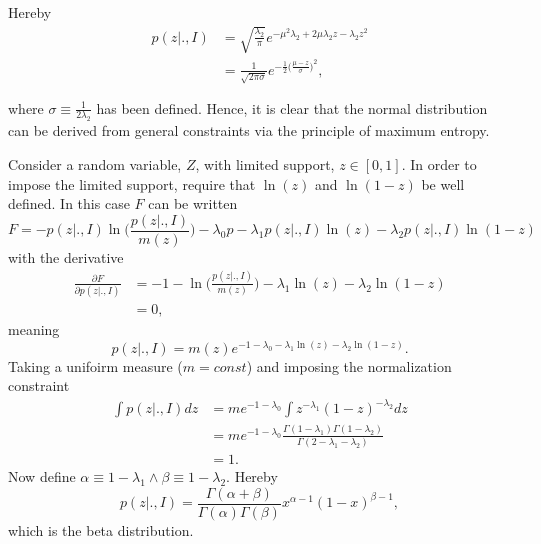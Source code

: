 \begin{example}
\begin{equation}
	\end{equation}
	Hereby
	\begin{equation}
		\begin{split}
			p(z|.,I) &= \sqrt{\frac{\lambda_2}{\pi}}e^{-\mu^2\lambda_2+2\mu \lambda_2z-\lambda_2z^2}\\
			&= \frac{1}{\sqrt{2\pi\sigma}}e^{-\frac{1}{2}\big(\frac{\mu-z}{\sigma}\big)^2},\\\\
		\end{split}
	\end{equation}
	where $\sigma\equiv \frac{1}{2\lambda_2}$ has been defined. Hence, it is clear that the normal distribution can be derived from general constraints via the principle of maximum entropy.
\end{example}

\begin{example}
	Consider a random variable, $Z$, with limited support, $z\in [0,1]$. In order to impose the limited support, require that $\ln(z)$ and $\ln(1-z)$ be well defined. In this case $F$ can be written\label{ex:beta}
	\begin{equation}
		F = -p(z|.,I)\ln\bigg(\frac{p(z|.,I)}{m(z)}\bigg)-\lambda_0p-\lambda_1p(z|.,I)\ln(z)-\lambda_2p(z|.,I)\ln(1-z)
	\end{equation}
	with the derivative
	\begin{equation}
		\begin{split}
			\frac{\partial F}{\partial p(z|.,I)} &= -1-\ln\bigg(\frac{p(z|.,I)}{m(z)}\bigg)-\lambda_1\ln(z)-\lambda_2\ln(1-z)\\
			&=0,
		\end{split}
	\end{equation}
	meaning
	\begin{equation}
		p(z|.,I)=m(z)e^{-1-\lambda_0-\lambda_1\ln(z)-\lambda_2\ln(1-z)}.
	\end{equation}
	Taking a unifoirm measure ($m= const$) and imposing the normalization constraint
	\begin{equation}
		\begin{split}
			\int p(z|.,I) dz &= me^{-1-\lambda_0}\int z^{-\lambda_1}(1-z)^{-\lambda_2}dz\\
			&= me^{-1-\lambda_0}\frac{\Gamma(1-\lambda_1)\Gamma(1-\lambda_2)}{\Gamma(2-\lambda_1-\lambda_2)}\\
			&=1.
		\end{split}
	\end{equation}
	Now define $\alpha \equiv 1-\lambda_1\wedge \beta \equiv 1-\lambda_2$. Hereby
	\begin{equation}
		p(z|.,I) = \frac{\Gamma(\alpha+\beta)}{\Gamma(\alpha)\Gamma(\beta)}x^{\alpha-1}(1-x)^{\beta-1},
	\end{equation}
	which is the beta distribution. 
\end{example}


